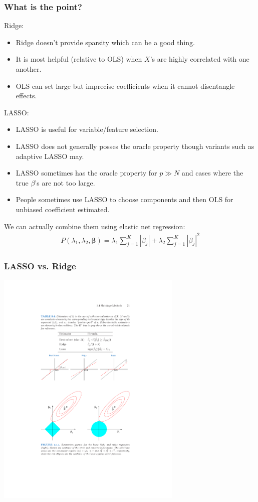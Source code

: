 \begin{frame}
\frametitle{What is the point?}
Ridge:
\begin{itemize}
\item Ridge doesn't provide sparsity which can be a good thing.
\item It is most helpful (relative to OLS) when $X$'s are highly correlated with one another.
\item OLS can set large but imprecise coefficients when it cannot disentangle effects.
\end{itemize}
LASSO:
\begin{itemize}
\item LASSO is useful for variable/feature selection.
\item LASSO does not generally posses the \alert{oracle property} though variants such as \alert{adaptive LASSO} may.
\item LASSO sometimes has the oracle property for $p \gg N$ and cases where the true $\beta$'s are not too large.
\item People sometimes use LASSO to choose components and then OLS for unbiased coefficient estimated.
\end{itemize}
We can actually combine them using \alert{elastic net regression}:
\begin{eqnarray*}
 P(\lambda_1,\lambda_2,\mathbf{\beta}) =  \lambda _1\sum_{j=1}^K | \beta_j|  +\lambda_2 \sum_{j=1}^K | \beta_j|^2 
 \end{eqnarray*}
\end{frame}


\begin{frame}
\frametitle{LASSO vs. Ridge}
\begin{center}
\includegraphics[width=3.5in]{./resources/orthcompare}
\end{center}
\end{frame}



